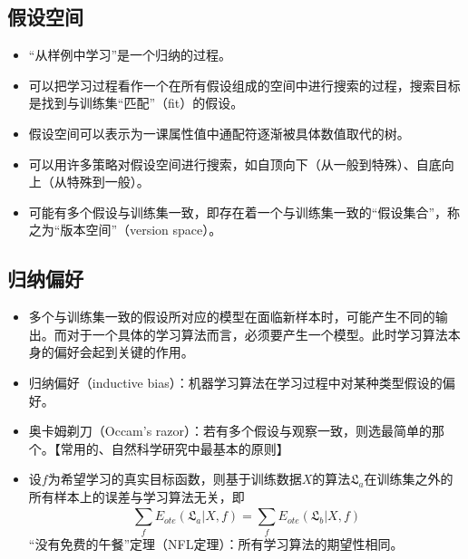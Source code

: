 \documentclass{ctexart}
\begin{document}
				\subsection{假设空间}
					\begin{itemize}
						\item ``从样例中学习''是一个归纳的过程。
						\item 可以把学习过程看作一个在所有假设组成的空间中进行搜索的过程，搜索目标是找到与训练集``匹配''（fit）的假设。
						\item 假设空间可以表示为一课属性值中通配符逐渐被具体数值取代的树。
						\item 可以用许多策略对假设空间进行搜索，如自顶向下（从一般到特殊）、自底向上（从特殊到一般）。
						\item 可能有多个假设与训练集一致，即存在着一个与训练集一致的``假设集合''，称之为``版本空间''（version space）。
					\end{itemize}
				\subsection{归纳偏好}
					\begin{itemize}
						\item 多个与训练集一致的假设所对应的模型在面临新样本时，可能产生不同的输出。而对于一个具体的学习算法而言，必须要产生一个模型。此时学习算法本身的偏好会起到关键的作用。
						\item 归纳偏好（inductive bias）：机器学习算法在学习过程中对某种类型假设的偏好。
						\item 奥卡姆剃刀（Occam's razor）：若有多个假设与观察一致，则选最简单的那个。【常用的、自然科学研究中最基本的原则】
						\item 设$f$为希望学习的真实目标函数，则基于训练数据$X$的算法$\mathfrak{L}_a$在训练集之外的所有样本上的误差与学习算法无关，即\[\sum_{f}^{}E_{ote}(\mathfrak{L}_a|X,f)=\sum_{f}^{}E_{ote}(\mathfrak{L}_b|X,f)\]``没有免费的午餐''定理（NFL定理）：所有学习算法的期望性相同。
					\end{itemize}
\end{document}
